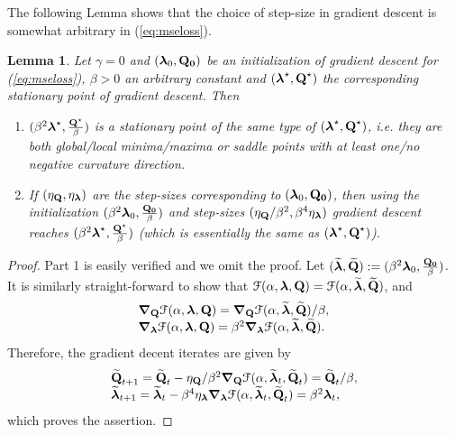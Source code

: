 \documentclass[11pt]{article}
\theoremstyle{plain}
\newtheorem{lemma}{Lemma}
\theoremstyle{plain}
\numberwithin{equation}{section}
\numberwithin{lemma}{section}
\numberwithin{theorem}{section}
\numberwithin{corollary}{section}
\numberwithin{observation}{section}
\numberwithin{definition}{section}
\numberwithin{example}{section}
\begin{document}
The following Lemma shows that the choice of step-size in gradient descent is somewhat arbitrary in (\ref{eq:mseloss}).
\begin{lemma} \label{lem:step_size} Let $\gamma = 0$ and $(\V{\lambda}_0,\Mx{Q_0})$ be an initialization of gradient descent for (\ref{eq:mseloss}), $\beta >0$ an arbitrary constant and $(\V{\lambda}^\star,\Mx{Q}^\star)$ the corresponding stationary point of gradient descent. Then
\begin{enumerate}
    \item $(\beta^2 \V{\lambda}^\star,\frac{\Mx{Q}^\star}{\beta})$ is a stationary point of the same type of $(\V{\lambda}^\star,\Mx{Q}^\star)$, i.e. they are both global/local minima/maxima or saddle points with at least one/no negative curvature direction.
    \item If $(\eta_{\Mx{Q}},\eta_{\V{\lambda}})$ are the step-sizes corresponding to $(\V{\lambda}_0,\Mx{Q_0})$, then using the initialization  $(\beta^2\V{\lambda}_0,\frac{\Mx{Q_0}}{\beta})$ and step-sizes $(\eta_{\Mx{Q}}/\beta^2,\beta^4\eta_{\V{\lambda}})$ gradient descent reaches $(\beta^2 \V{\lambda}^\star,\frac{\Mx{Q}^\star}{\beta})$ (which is essentially the same as $(\V{\lambda}^\star,\Mx{Q}^\star)$).
\end{enumerate}
\end{lemma}
\begin{proof}
Part 1 is easily verified and we omit the proof. Let $(\widetilde{\V{\lambda}},\widetilde{\Mx{Q}}):=(\beta^2\V{\lambda}_0,\frac{\Mx{Q_0}}{\beta})$. It is similarly straight-forward to show that $\mathcal{F}(\alpha,\V{\lambda},\Mx{Q}) = \mathcal{F}(\alpha,\widetilde{\V{\lambda}},\widetilde{\Mx{Q}})$, and
\[
\begin{array}{l}
     \Mx{\nabla}_{\Mx{Q}} \mathcal{F}(\alpha,\V{\lambda},\Mx{Q}) = {\Mx{\nabla}_{\Mx{Q}} \mathcal{F}(\alpha,\widetilde{\V{\lambda}},\widetilde{\Mx{Q}})}/{\beta},  \\
     \Mx{\nabla}_{\V{\lambda}} \mathcal{F}(\alpha,\V{\lambda},\Mx{Q}) = \beta^2{\Mx{\nabla}_{\Mx{\lambda}} \mathcal{F}(\alpha,\widetilde{\V{\lambda}},\widetilde{\Mx{Q}})}. 
\end{array}
\]
Therefore, the gradient decent iterates are given by
\[
\begin{array}{l}
\widetilde{\Mx{Q}}_{t+1} = \widetilde{\Mx{Q}}_{t} - \eta_{\Mx{Q}}/\beta^2 \Mx{\nabla}_{\Mx{Q}} \mathcal{F}(\alpha,\widetilde{\V{\lambda}}_t,\widetilde{\Mx{Q}}_t)  =\widetilde{\Mx{Q}}_t/\beta, \\
\widetilde{\V{\lambda}}_{t+1} = \widetilde{\V{\lambda}}_{t} - \beta^4 \eta_{\V{\lambda}}\Mx{\nabla}_{\Mx{\lambda}} \mathcal{F}(\alpha,\widetilde{\V{\lambda}}_t,\widetilde{\Mx{Q}}_t) =\beta^2 {\V{\lambda}}_t,
\end{array}
\]
which proves the assertion.
\end{proof}
\end{document}

